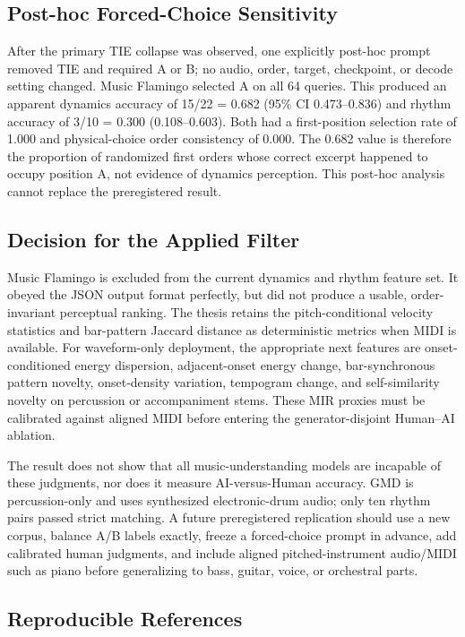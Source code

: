 \subsection{Post-hoc Forced-Choice Sensitivity}

After the primary TIE collapse was observed, one explicitly post-hoc prompt
removed TIE and required A or B; no audio, order, target, checkpoint, or decode
setting changed. Music Flamingo selected A on all 64 queries. This produced an
apparent dynamics accuracy of 15/22 = 0.682 (95\% CI 0.473--0.836) and rhythm
accuracy of 3/10 = 0.300 (0.108--0.603). Both had a first-position selection
rate of 1.000 and physical-choice order consistency of 0.000. The 0.682 value
is therefore the proportion of randomized first orders whose correct excerpt
happened to occupy position A, not evidence of dynamics perception. This
post-hoc analysis cannot replace the preregistered result.

\subsection{Decision for the Applied Filter}

Music Flamingo is excluded from the current dynamics and rhythm feature set. It
obeyed the JSON output format perfectly, but did not produce a usable,
order-invariant perceptual ranking. The thesis retains the pitch-conditional
velocity statistics and bar-pattern Jaccard distance as deterministic metrics
when MIDI is available. For waveform-only deployment, the appropriate next
features are onset-conditioned energy dispersion, adjacent-onset energy change,
bar-synchronous pattern novelty, onset-density variation, tempogram change, and
self-similarity novelty on percussion or accompaniment stems. These MIR proxies
must be calibrated against aligned MIDI before entering the generator-disjoint
Human--AI ablation.

The result does not show that all music-understanding models are incapable of
these judgments, nor does it measure AI-versus-Human accuracy. GMD is
percussion-only and uses synthesized electronic-drum audio; only ten rhythm
pairs passed strict matching. A future preregistered replication should use a
new corpus, balance A/B labels exactly, freeze a forced-choice prompt in
advance, add calibrated human judgments, and include aligned pitched-instrument
audio/MIDI such as piano before generalizing to bass, guitar, voice, or
orchestral parts.

\subsection{Reproducible References}


